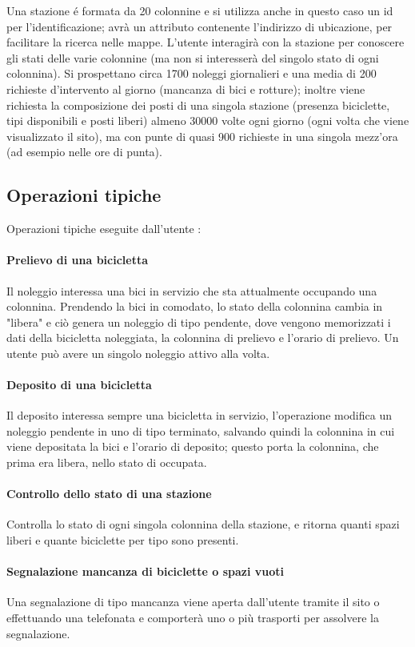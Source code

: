 \documentclass[a4paper,twoside]{article}
\begin{document}
Una stazione é formata da 20 colonnine e si utilizza anche in questo caso un id per l'identificazione; avrà un attributo contenente l'indirizzo di ubicazione, per facilitare la ricerca nelle mappe. L'utente interagirà con la stazione per conoscere gli stati delle varie colonnine (ma non si interesserà del singolo stato di ogni colonnina).\newline
Si prospettano circa 1700 noleggi giornalieri e una media di 200 richieste d'intervento al giorno (mancanza di bici e rotture); inoltre viene richiesta la composizione dei posti di una singola stazione (presenza biciclette, tipi disponibili e posti liberi) almeno 30000 volte ogni giorno (ogni volta che viene visualizzato il sito), ma con punte di quasi 900 richieste in una singola mezz'ora (ad esempio nelle ore di punta).

\subsection{Operazioni tipiche}
Operazioni tipiche eseguite dall'utente :
\paragraph{Prelievo di una bicicletta} Il noleggio interessa una bici in servizio che sta attualmente occupando una colonnina. Prendendo la bici in comodato, lo stato della colonnina cambia in "libera" e ciò genera un noleggio di tipo pendente, dove vengono memorizzati i dati della bicicletta noleggiata, la colonnina di prelievo e l'orario di prelievo. Un utente può avere un singolo noleggio attivo alla volta.
\paragraph{Deposito di una bicicletta} Il deposito interessa sempre una bicicletta in servizio, l'operazione modifica un noleggio pendente in uno di tipo terminato, salvando quindi la colonnina in cui viene depositata la bici e l'orario di deposito; questo porta la colonnina, che prima era libera, nello stato di occupata.
\paragraph{Controllo dello stato di una stazione} Controlla lo stato di ogni singola colonnina della stazione, e ritorna quanti spazi liberi e quante biciclette per tipo sono presenti.
\paragraph{Segnalazione mancanza di biciclette o spazi vuoti} Una segnalazione di tipo mancanza viene aperta dall'utente tramite il sito o effettuando una telefonata e comporterà uno o più trasporti per assolvere la segnalazione.
\end{document}
